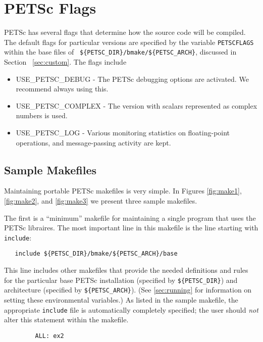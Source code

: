 {\section{PETSc Flags}
\label{sec:makeflags}

PETSc has several flags that determine how the source code will be
compiled.  The default flags for particular versions are specified by
the variable {\tt PETSCFLAGS} within the base files of {\tt
\$\{PETSC\_DIR\}/bmake/\$\{PETSC\_ARCH\}}, discussed in Section
~\ref{sec:custom}.  The flags include
\begin{itemize}
\item USE\_PETSC\_DEBUG - The PETSc debugging options are activated. We 
      recommend always using this. 
\item USE\_PETSC\_COMPLEX - The version with scalars represented 
      as complex numbers is used. 
\item USE\_PETSC\_LOG - Various monitoring statistics on floating-point operations,
      and message-passing activity are kept. 
\end{itemize}

\subsection{Sample Makefiles}

Maintaining portable PETSc makefiles is very simple. In Figures
\ref{fig:make1}, \ref{fig:make2}, and \ref{fig:make3} we present three
sample makefiles.  

The first is a ``minimum'' makefile for maintaining
a single program that uses the PETSc libraires.
The most important line in this makefile is the line starting with {\tt include}:
\begin{verbatim}
   include ${PETSC_DIR}/bmake/${PETSC_ARCH}/base
\end{verbatim}
This line includes other makefiles that provide the needed definitions
and rules for the particular base PETSc installation (specified by
{\tt \$\{PETSC\_DIR\}}) and architecture (specified by
{\tt \$\{PETSC\_ARCH\}}).  (See \ref{sec:running} for information on
setting these environmental variables.)  As listed in the sample
makefile, the appropriate {\tt include} file is automatically
completely specified; the user should {\em not} alter this statement
within the makefile.

\begin{figure}[H]
{\small
\begin{verbatim}
   ALL: ex2


\end{verbatim}}
\end{figure}}
